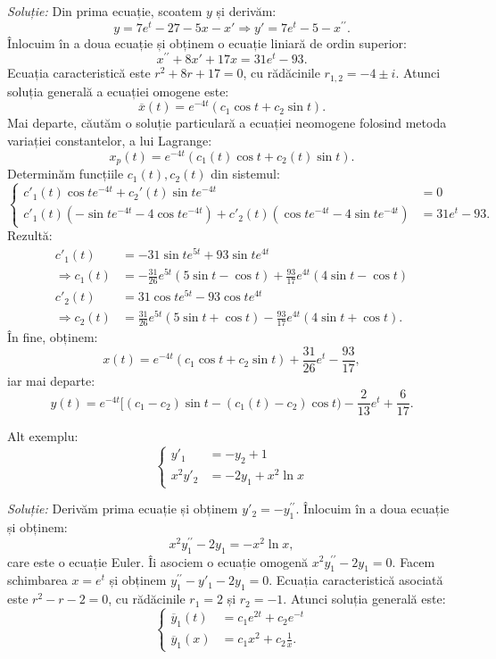 \documentclass[11pt,a4paper]{article}
\theoremstyle{dotless}
\theoremstyle{dotlessdr}
\begin{document}
\emph{Soluție:} Din prima ecuație, scoatem $y$ și derivăm:
\[
  y = 7e^t - 27 - 5x - x' \Rightarrow y' = 7e^t - 5 - x^{\prime\prime}.
\]
Înlocuim în a doua ecuație și obținem o ecuație liniară de ordin superior:
\[
  x^{\prime\prime} + 8x' + 17x = 31e^t - 93.
\]
Ecuația caracteristică este $r^2 + 8r + 17 = 0$, cu rădăcinile $r_{1,2} = -4 \pm i$.
Atunci soluția generală a ecuației omogene este:
\[
  \overline{x}(t) = e^{-4t}(c_1 \cos t + c_2 \sin t).
\]
Mai departe, căutăm o soluție particulară a ecuației neomogene folosind metoda
variației constantelor, a lui Lagrange:
\[
  x_p(t) = e^{-4t}(c_1(t) \cos t + c_2(t) \sin t).
\]
Determinăm funcțiile $c_1(t), c_2(t)$ din sistemul:
\[
  \begin{cases}
    c'_1(t) \cos t e^{-4t} + c_2'(t) \sin t e^{-4t} &= 0 \\
    c'_1(t) (-\sin t e^{-4t} - 4\cos t e^{-4t}) + %
    c'_2(t) (\cos t e^{-4t} - 4\sin t e^{-4t}) &= 31e^t - 93.
  \end{cases}
\]
Rezultă:
\begin{align*}
  c'_1(t) &= -31 \sin t e^{5t} + 93 \sin t e^{4t} \\
  \Rightarrow c_1(t) &= -\frac{31}{26} e^{5t}(5 \sin t - \cos t) + %
                        \frac{93}{17} e^{4t}(4 \sin t - \cos t) \\
  c'_2(t) &= 31 \cos t e^{5t} - 93\cos t e^{4t} \\
  \Rightarrow c_2(t) &= \frac{31}{26} e^{5t}(5 \sin t + \cos t) - %
                       \frac{93}{17} e^{4t}(4 \sin t + \cos t).
\end{align*}
În fine, obținem:
\[
  x(t) = e^{-4t}(c_1 \cos t + c_2 \sin t) + \frac{31}{26}e^t - \frac{93}{17},
\]
iar mai departe:
\[
  y(t) = e^{-4t}[(c_1 - c_2) \sin t - (c_1(t) - c_2) \cos t) - \frac{2}{13} e^t + \frac{6}{17}.
\]

\vspace{1cm}

Alt exemplu:
\[
  \begin{cases}
    y'_1 &= -y_2 + 1 \\
    x^2 y'_2 &= -2y_1 + x^2 \ln x
  \end{cases}
\]

\emph{Soluție:} Derivăm prima ecuație și obținem $y'_2 = -y_1^{\prime\prime}$.
Înlocuim în a doua ecuație și obținem:
\[
  x^2 y_1^{\prime\prime} - 2y_1 = -x^2 \ln x,
\]
care este o ecuație Euler. Îi asociem o ecuație omogenă $x^2y_1^{\prime\prime} - 2y_1 = 0$.
Facem schimbarea $x = e^t$ și obținem $y_1^{\prime\prime} - y'_1 - 2y_1 = 0$.
Ecuația caracteristică asociată este $r^2 - r - 2 = 0$, cu rădăcinile $r_1 = 2$
și $r_2 = -1$. Atunci soluția generală este:
\[
  \begin{cases}
    \overline{y}_1(t) &= c_1 e^{2t} + c_2 e^{-t} \\
    \overline{y}_1(x) &= c_1 x^2 + c_2 \frac{1}{x}.
  \end{cases}
\]
\end{document}
